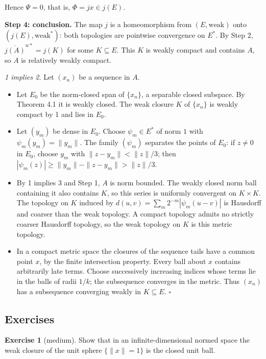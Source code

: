 \documentclass[
  english,
  11pt,
  a4paper,
]{article}
\providecommand{\tightlist}{%
  \setlength{\itemsep}{0pt}\setlength{\parskip}{0pt}}
\begin{document}
Hence \(\Psi=0\), that is, \(\Phi=jx\in j(E)\).

\textbf{Step 4: conclusion.} The map \(j\) is a homeomorphism from
\((E,\text{weak})\) onto \((j(E),\text{weak}^*)\): both topologies are
pointwise convergence on \(E^*\). By Step 2,
\(\overline{j(A)}^{w*}=j(K)\) for some \(K\subseteq E\). This \(K\) is
weakly compact and contains \(A\), so \(A\) is relatively weakly
compact.

\emph{1 implies 2.} Let \((x_n)\) be a sequence in \(A\).

\begin{itemize}
\tightlist
\item
  Let \(E_0\) be the norm-closed span of \(\{x_n\}\), a separable closed
  subspace. By Theorem 4.1 it is weakly closed. The weak closure \(K\)
  of \(\{x_n\}\) is weakly compact by 1 and lies in \(E_0\).
\item
  Let \((y_m)\) be dense in \(E_0\). Choose \(\psi_m\in E^*\) of norm
  \(1\) with \(\psi_m(y_m)=\|y_m\|\). The family \((\psi_m)\) separates
  the points of \(E_0\): if \(z\ne0\) in \(E_0\), choose \(y_m\) with
  \(\|z-y_m\|<\|z\|/3\); then
  \(|\psi_m(z)|\ge\|y_m\|-\|z-y_m\|>\|z\|/3\).
\item
  By 1 implies 3 and Step 1, \(A\) is norm bounded. The weakly closed
  norm ball containing it also contains \(K\), so this series is
  uniformly convergent on \(K\times K\). The topology on \(K\) induced
  by \(d(u,v)=\sum_m2^{-m}|\psi_m(u-v)|\) is Hausdorff and coarser than
  the weak topology. A compact topology admits no strictly coarser
  Hausdorff topology, so the weak topology on \(K\) is this metric
  topology.
\item
  In a compact metric space the closures of the sequence tails have a
  common point \(x\), by the finite intersection property. Every ball
  about \(x\) contains arbitrarily late terms. Choose successively
  increasing indices whose terms lie in the balls of radii \(1/k\); the
  subsequence converges in the metric. Thus \((x_n)\) has a subsequence
  converging weakly in \(K\subseteq E\). \(\square\)
\end{itemize}

\subsection{Exercises}\label{weak-topologies-tychonoff-banach-alaoglu-mazur-bipolars-krein-milman-and-eberlein-smulian--exercises}

\textbf{Exercise 1} (medium). Show that in an infinite-dimensional
normed space the weak closure of the unit sphere \(\{\|x\|=1\}\) is the
closed unit ball.
\end{document}
